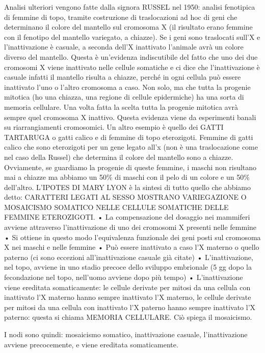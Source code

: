 \documentclass[11pt]{book}
\begin{document}
Analisi ulteriori vengono fatte dalla signora RUSSEL nel 1950: analisi fenotipica di femmine di topo, tramite costruzione di traslocazioni ad hoc di geni che determinano il colore del mantello sul cromosoma X (il risultato erano femmine con il fenotipo del mantello variegato, a chiazze). Se i geni sono traslocati sull’X e l’inattivazione è casuale, a seconda dell’X inattivato l’animale avrà un colore diverso del mantello.
Questa è un’evidenza indiscutibile del fatto che uno dei due cromosomi X viene inattivato nelle cellule somatiche e ci dice che l’inattivazione è casuale infatti il mantello risulta a chiazze, perché in ogni cellula può essere inattivato l’uno o l’altro cromosoma a caso.
Non solo, ma che tutta la progenie mitotica (ho una chiazza, una regione di cellule epidermiche) ha una sorta di memoria cellulare. Una volta fatta la scelta tutta la progenie mitotica avrà sempre quel cromosoma X inattivo. Questa evidenza viene da esperimenti banali su riarrangiamenti cromosomici. 
Un altro esempio è quello dei GATTI TARTARUGA o gatti calico e di femmine di topo eterozigoti. Femmine di gatti calico che sono eterozigoti per un gene legato all’x (non è una traslocazione come nel caso della Russel) che determina il colore del mantello sono a chiazze. Ovviamente, se guardiamo la progenie di queste femmine, i maschi non risultano mai a chiazze ma abbiamo un 50\% di maschi con il pelo di un colore e un 50\% dell’altro.
L’IPOTES DI MARY LYON è la sintesi di tutto quello che abbiamo detto:
CARATTERI LEGATI AL SESSO MOSTRANO VARIEGAZIONE O MOSAICISMO SOMATICO NELLE CELLULE SOMATICHE DELLE FEMMINE ETEROZIGOTI.
    • La compensazione del dosaggio nei mammiferi avviene attraverso l’inattivazione di uno dei cromosomi X presenti nelle femmine
    • Si ottiene in questo modo l’equivalenza funzionale dei geni posti sul cromosoma X nei maschi e nelle femmine
    • Può essere inattivato a caso l’X materno o quello paterno (ci sono eccezioni all’inattivazione casuale già citate)
    • L’inattivazione, nel topo, avviene in uno stadio precoce dello sviluppo embrionale (5 gg dopo la fecondazione nel topo, nell’uomo avviene dopo più tempo)
    • L’inattivazione viene ereditata somaticamente: le cellule derivate per mitosi da una cellula con inattivato l’X materno hanno sempre inattivato l’X materno, le cellule derivate per mitosi da una cellula con inattivato l’X paterno hanno sempre inattivato l’X paterno: questa si chiama MEMORIA CELLULARE. Ciò spiega il mosaicismo.

I nodi sono quindi: mosaicismo somatico, inattivazione casuale, l’inattivazione avviene precocemente, e viene ereditata somaticamente.
\end{document}
